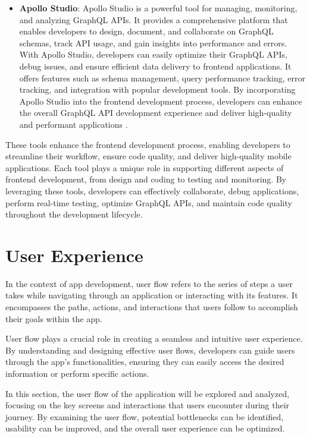 \begin{itemize}
\item \textbf{Apollo Studio}: Apollo Studio is a powerful tool for managing, monitoring, and analyzing GraphQL APIs. It provides a comprehensive platform that enables developers to design, document, and collaborate on GraphQL schemas, track API usage, and gain insights into performance and errors. With Apollo Studio, developers can easily optimize their GraphQL APIs, debug issues, and ensure efficient data delivery to frontend applications. It offers features such as schema management, query performance tracking, error tracking, and integration with popular development tools. By incorporating Apollo Studio into the frontend development process, developers can enhance the overall GraphQL API development experience and deliver high-quality and performant applications \cite{apollostudio}.

\end{itemize}


These tools enhance the frontend development process, enabling developers to streamline their workflow, ensure code quality, and deliver high-quality mobile applications. Each tool plays a unique role in supporting different aspects of frontend development, from design and coding to testing and monitoring. By leveraging these tools, developers can effectively collaborate, debug applications, perform real-time testing, optimize GraphQL APIs, and maintain code quality throughout the development lifecycle.



    \section{User Experience}
\label{sec:ux-enhancements}



In the context of app development, user flow refers to the series of steps a user takes while navigating through an application or interacting with its features. It encompasses the paths, actions, and interactions that users follow to accomplish their goals within the app.

User flow plays a crucial role in creating a seamless and intuitive user experience. By understanding and designing effective user flows, developers can guide users through the app's functionalities, ensuring they can easily access the desired information or perform specific actions.

In this section, the user flow of the application will be explored and analyzed, focusing on the key screens and interactions that users encounter during their journey. By examining the user flow, potential bottlenecks can be identified, usability can be improved, and the overall user experience can be optimized.
\newpage 
